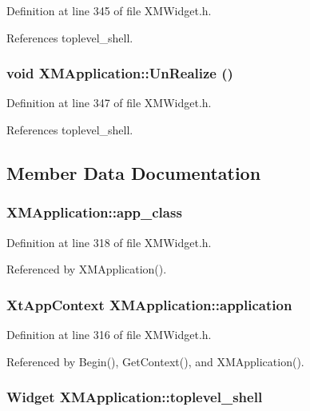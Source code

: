 Definition at line 345 of file XMWidget.h.

References toplevel\_\-shell.
\subsubsection{\setlength{\rightskip}{0pt plus 5cm}void XMApplication::Un\-Realize ()\hspace{0.3cm}{\tt  [inline]}}\label{classXMApplication_a7}




Definition at line 347 of file XMWidget.h.

References toplevel\_\-shell.

\subsection{Member Data Documentation}
\subsubsection{ XMApplication::app\_\-class\hspace{0.3cm}{\tt  [protected]}}\label{classXMApplication_n2}




Definition at line 318 of file XMWidget.h.

Referenced by XMApplication().
\subsubsection{\setlength{\rightskip}{0pt plus 5cm}Xt\-App\-Context XMApplication::application\hspace{0.3cm}{\tt  [protected]}}\label{classXMApplication_n0}




Definition at line 316 of file XMWidget.h.

Referenced by Begin(), Get\-Context(), and XMApplication().
\subsubsection{\setlength{\rightskip}{0pt plus 5cm}Widget XMApplication::toplevel\_\-shell\hspace{0.3cm}{\tt  [protected]}}\label{classXMApplication_n1}




